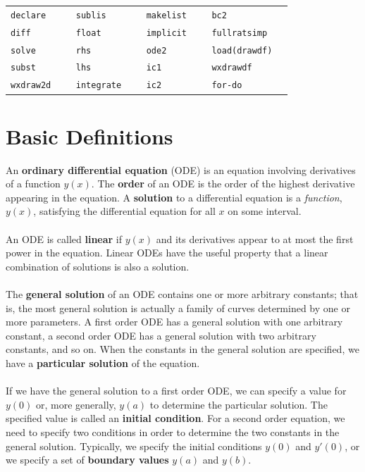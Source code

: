 \documentclass[10.5pt,twoside]{report}
\theoremstyle{definition}
\begin{document}
\begin{tabular}{l l l l}
 \verb|declare   |   &\verb|sublis   |   &\verb|makelist   | &\verb|bc2   |  \\
 \verb|diff   |   &\verb|float   |   &\verb|implicit   | &\verb|fullratsimp   |   \\
 \verb|solve   |   &\verb|rhs   |   &\verb|ode2   | &\verb|load(drawdf) |  \\
 \verb|subst   |   &\verb|lhs   |   &\verb|ic1   | &\verb|wxdrawdf   |  \\
 \verb|wxdraw2d   |   &\verb|integrate   |   &\verb|ic2   |  &\verb|for-do  | \\
\end{tabular}



\pagebreak
\section{Basic Definitions}\label{Basic Definitions}

An \textbf{ordinary differential equation} (ODE) is an equation involving derivatives of a function $y(x)$.  The \textbf{order} of an ODE is the order of the highest derivative appearing in the equation.  A \textbf{solution} to a differential equation is a \textit{function}, $y(x)$, satisfying the differential equation for all $x$ on some interval.\\
${}$\\
An ODE is called \textbf{linear} if $y(x)$ and its derivatives appear to at most the first power in the equation.  Linear ODEs have the useful property that a linear combination of solutions is also a solution.\\
${}$\\
The \textbf{general solution} of an ODE contains one or more arbitrary constants; that is, the most general solution is actually a family of curves determined by one or more parameters.  A first order ODE has a general solution with one arbitrary constant, a second order ODE has a general solution with two arbitrary constants, and so on.  When the constants in the general solution are specified, we have a \textbf{particular solution} of the equation.  \\
${}$\\
If we have the general solution to a first order ODE, we can specify a value for $y(0)$ or, more generally, $y(a)$ to determine the particular solution.  The specified value is called an \textbf{initial condition}.  For a second order equation, we need to specify two conditions in order to determine the two constants in the general solution.  Typically, we specify the initial conditions $y(0)$ and $y'(0)$, or we specify a set of \textbf{boundary values} $y(a)$ and $y(b)$. 
${}$\\ 
${}$\\
\end{document}
